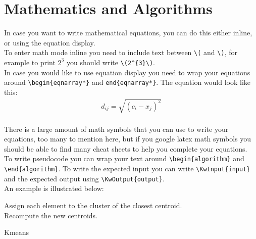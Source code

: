 \section{Mathematics and Algorithms}
In case you want to write mathematical equations, you can do this either inline, or using the equation display. \\
To enter math mode inline you need to include text between \verb|\(| and \verb|\)|, for example to print \(2^{3}\) you should write \verb|\(2^{3}\)|. \\
In case you would like to use equation display you need to wrap your equations around \verb|\begin{eqnarray*}| and \verb|end{eqnarray*}|. The equation would look like this:
\begin{eqnarray*}
d_{ij} = \sqrt{(c_{i}-x_{j})^2}
\end{eqnarray*}
\\
There is a large amount of math symbols that you can use to write your equations, too many to mention here, but if you google latex math symbols you should be able to find many cheat sheets to help you complete your equations. \\

To write pseudocode you can wrap your text around \verb|\begin{algorithm}| and \verb|\end{algorithm}|. To write the expected input you can write \verb|\KwInput{input}| and the expected output using \verb|\KwOutput{output}|. \\
An example is illustrated below:
\begin{algorithm}
\SetAlgoLined
{
Assign each element to the cluster of the closest centroid.\\
Recompute the new centroids.
}
\caption{Kmeans}\label{alg:kmeans}
\end{algorithm} 